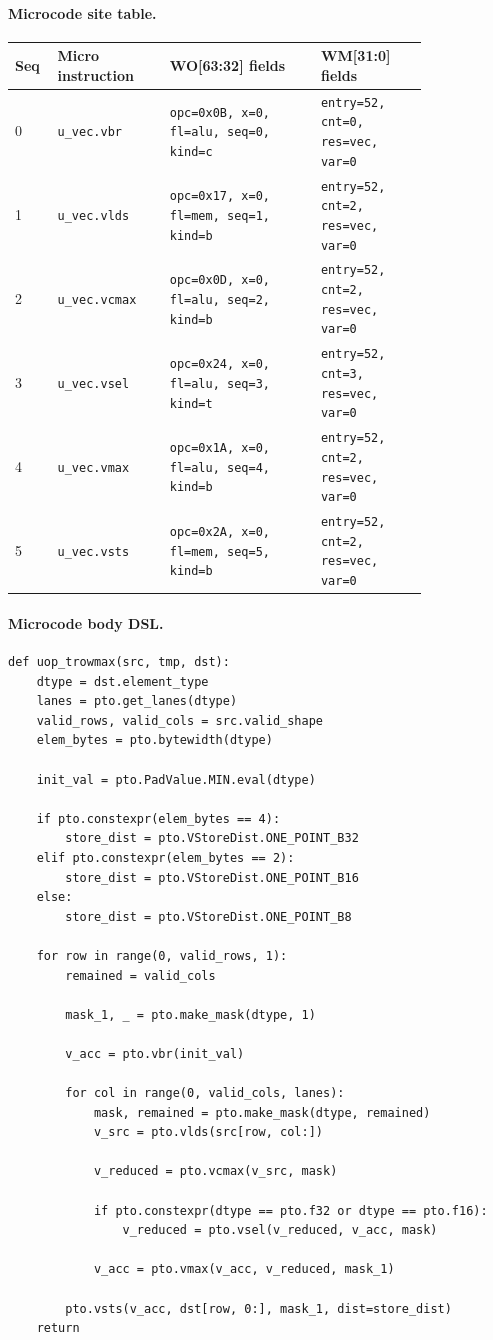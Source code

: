\paragraph{Microcode site table.}
{\scriptsize
\begin{longtable}{@{}R{0.055\linewidth}L{0.23\linewidth}L{0.31\linewidth}L{0.22\linewidth}@{}}
\toprule
Seq & Micro instruction & WO[63:32] fields & WM[31:0] fields \\
 & \texttt{u\_vec.vbr} & \texttt{opc=0x0B, x=0, fl=alu, seq=0, kind=c} & \texttt{entry=52, cnt=0, res=vec, var=0} \\
1 & \texttt{u\_vec.vlds} & \texttt{opc=0x17, x=0, fl=mem, seq=1, kind=b} & \texttt{entry=52, cnt=2, res=vec, var=0} \\
2 & \texttt{u\_vec.vcmax} & \texttt{opc=0x0D, x=0, fl=alu, seq=2, kind=b} & \texttt{entry=52, cnt=2, res=vec, var=0} \\
3 & \texttt{u\_vec.vsel} & \texttt{opc=0x24, x=0, fl=alu, seq=3, kind=t} & \texttt{entry=52, cnt=3, res=vec, var=0} \\
4 & \texttt{u\_vec.vmax} & \texttt{opc=0x1A, x=0, fl=alu, seq=4, kind=b} & \texttt{entry=52, cnt=2, res=vec, var=0} \\
5 & \texttt{u\_vec.vsts} & \texttt{opc=0x2A, x=0, fl=mem, seq=5, kind=b} & \texttt{entry=52, cnt=2, res=vec, var=0} \\
\bottomrule
\end{longtable}
}
\paragraph{Microcode body DSL.}
\begin{lstlisting}[style=ptocode]
def uop_trowmax(src, tmp, dst):
    dtype = dst.element_type
    lanes = pto.get_lanes(dtype)
    valid_rows, valid_cols = src.valid_shape
    elem_bytes = pto.bytewidth(dtype)

    init_val = pto.PadValue.MIN.eval(dtype)

    if pto.constexpr(elem_bytes == 4):
        store_dist = pto.VStoreDist.ONE_POINT_B32
    elif pto.constexpr(elem_bytes == 2):
        store_dist = pto.VStoreDist.ONE_POINT_B16
    else:
        store_dist = pto.VStoreDist.ONE_POINT_B8

    for row in range(0, valid_rows, 1):
        remained = valid_cols

        mask_1, _ = pto.make_mask(dtype, 1)

        v_acc = pto.vbr(init_val)

        for col in range(0, valid_cols, lanes):
            mask, remained = pto.make_mask(dtype, remained)
            v_src = pto.vlds(src[row, col:])

            v_reduced = pto.vcmax(v_src, mask)

            if pto.constexpr(dtype == pto.f32 or dtype == pto.f16):
                v_reduced = pto.vsel(v_reduced, v_acc, mask)

            v_acc = pto.vmax(v_acc, v_reduced, mask_1)

        pto.vsts(v_acc, dst[row, 0:], mask_1, dist=store_dist)
    return
\end{lstlisting}
\Needspace{0.34\textheight}
